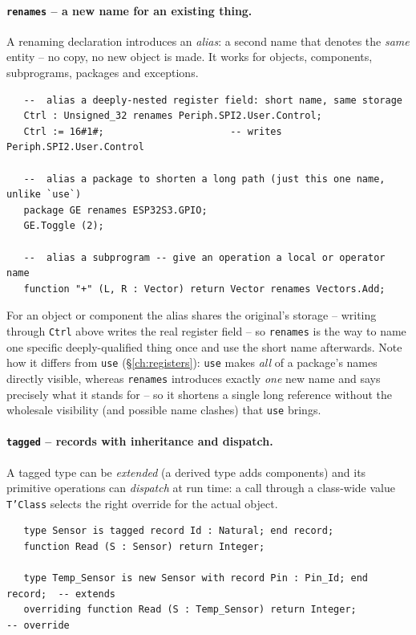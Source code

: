 \paragraph{\texttt{renames} -- a new name for an existing thing.} A renaming
declaration introduces an \emph{alias}: a second name that denotes the \emph{same}
entity -- no copy, no new object is made. It works for objects, components,
subprograms, packages and exceptions.

\begin{lstlisting}
   --  alias a deeply-nested register field: short name, same storage
   Ctrl : Unsigned_32 renames Periph.SPI2.User.Control;
   Ctrl := 16#1#;                      -- writes Periph.SPI2.User.Control

   --  alias a package to shorten a long path (just this one name, unlike `use`)
   package GE renames ESP32S3.GPIO;
   GE.Toggle (2);

   --  alias a subprogram -- give an operation a local or operator name
   function "+" (L, R : Vector) return Vector renames Vectors.Add;
\end{lstlisting}

For an object or component the alias shares the original's storage -- writing
through \texttt{Ctrl} above writes the real register field -- so \texttt{renames}
is the way to name one specific deeply-qualified thing once and use the short name
afterwards. Note how it differs from \texttt{use} (\S\ref{ch:registers}):
\texttt{use} makes \emph{all} of a package's names directly visible, whereas
\texttt{renames} introduces exactly \emph{one} new name and says precisely what it
stands for -- so it shortens a single long reference without the wholesale
visibility (and possible name clashes) that \texttt{use} brings.

\paragraph{\texttt{tagged} -- records with inheritance and dispatch.} A tagged
type can be \emph{extended} (a derived type adds components) and its primitive
operations can \emph{dispatch} at run time: a call through a class-wide value
\texttt{T'Class} selects the right override for the actual object.

\begin{lstlisting}
   type Sensor is tagged record Id : Natural; end record;
   function Read (S : Sensor) return Integer;

   type Temp_Sensor is new Sensor with record Pin : Pin_Id; end record;  -- extends
   overriding function Read (S : Temp_Sensor) return Integer;            -- override
\end{lstlisting}

